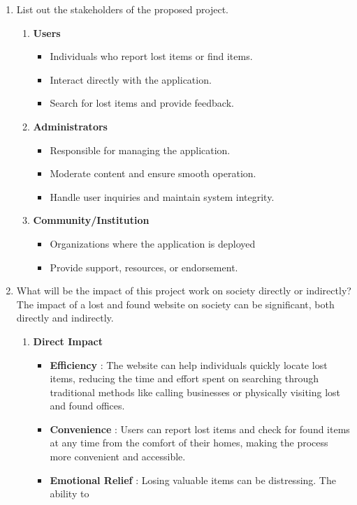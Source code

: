 \documentclass[14pt]{article}
\begin{document}
\begin{enumerate}
\begin{enumerate}
\end{enumerate}
\item List out the stakeholders of the proposed project.
\begin{enumerate}
\item \textbf{Users}
\begin{itemize}
\item Individuals who report lost items or find items.
\item Interact directly with the application.
\item Search for lost items and provide feedback.
\end{itemize}
\item \textbf{Administrators}
\begin{itemize}
\item Responsible for managing the application. 
\item Moderate content and ensure smooth operation.
\item Handle user inquiries and maintain system integrity. 
\end{itemize}
\item \textbf{Community/Institution}
\begin{itemize}
\item Organizations where the application is deployed
\item Provide support, resources, or endorsement.
\end{itemize}
\end{enumerate}
\item What will be the impact of this project work on society directly or indirectly?\\
\tabto{.5cm}The impact of a lost and found website on society can be significant, both directly
and indirectly.
\begin{enumerate}
\item \textbf{Direct Impact}
\begin{itemize}
\item \textbf{Efficiency} : The website can help individuals quickly locate lost items,
reducing the time and effort spent on searching through traditional methods like calling businesses or physically visiting lost and found offices.
\item \textbf{Convenience} : Users can report lost items and check for found items at any
time from the comfort of their homes, making the process more convenient
and accessible.
\item \textbf{Emotional Relief} : Losing valuable items can be distressing. The ability to

\end{itemize}
\end{enumerate}
\end{enumerate}
\end{document}
